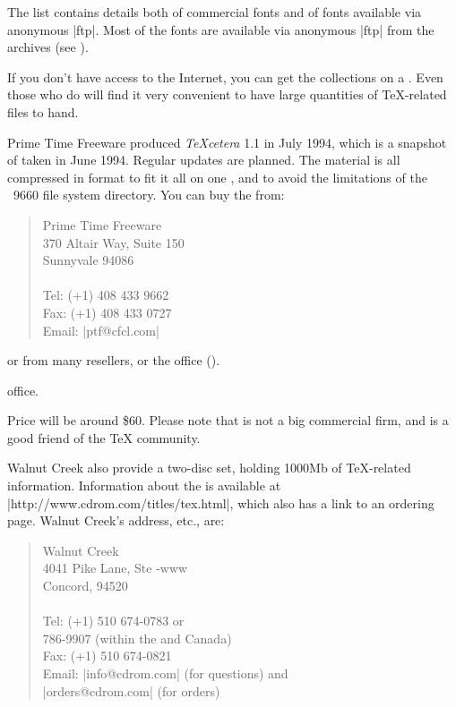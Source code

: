 The list contains details both of commercial fonts and of fonts
available via anonymous |ftp|. Most of the fonts are available via
anonymous |ftp| from the  archives
(see ).


If you don't have access to the Internet, you can get the 
collections on a \CDROM{}. Even those who do will
find it very convenient to have large quantities of \TeX{}-related
files to hand.

Prime Time Freeware produced \emph{\TeX{}cetera} 1.1 in July 1994,
which is a snapshot of  taken in June 1994. Regular updates are planned.
The material is all compressed in  format to fit it all on
one , and to avoid the limitations of the ~9660
file system directory. You can buy the  from:
\begin{quote}
  Prime Time Freeware\\
  370 Altair Way, Suite 150\\
  Sunnyvale  94086  \\
  \\
  Tel: (+1) 408 433 9662\\
  Fax: (+1) 408 433 0727\\
  Email: \Email|ptf@cfcl.com|
\end{quote}
or from many \CDROM{} resellers, or the
\htmlignore
{} office ().
\endhtmlignore
\begin{htmlversion}
   office.
\end{htmlversion}
Price will be around \$60. Please note that  is not a big
commercial firm, and is a good friend of the \TeX{} community.

Walnut Creek  also provide a two-disc \CDROM{} set, holding
1000Mb of \TeX{}-related information.  Information about the \CDROM{} is
available at \URL|http://www.cdrom.com/titles/tex.html|, which also
has a link to an ordering page.  Walnut Creek's address, etc., are:
\begin{quote}
  Walnut Creek \\
  4041 Pike Lane, Ste -www\\
  Concord,  94520\\
  \\
  Tel: (+1) 510 674-0783 or
  \htmlignore
  \\ \hphantom{Tel: }%
   786-9907 (within the  and Canada)\\
  Fax: (+1) 510 674-0821\\
  Email: \Email|info@cdrom.com| (for questions) and
  \htmlignore
  \\ \hphantom{Email: }%
  \endhtmlignore
  \Email|orders@cdrom.com| (for orders)
\end{quote}

